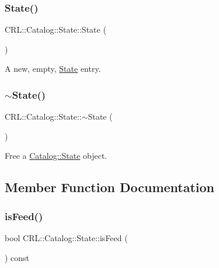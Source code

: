 \subsubsection{\texorpdfstring{State()}{State()}}
{\footnotesize\ttfamily C\+R\+L\+::\+Catalog\+::\+State\+::\+State (\begin{DoxyParamCaption}{ }\end{DoxyParamCaption})\hspace{0.3cm}{\ttfamily [inline]}}

A new, empty, \mbox{\hyperlink{classCRL_1_1Catalog_1_1State}{State}} entry. \mbox{\label{classCRL_1_1Catalog_1_1State_ae25003eae8262a994fba979f28c35aed}} 
\subsubsection{\texorpdfstring{$\sim$\+State()}{~State()}}
{\footnotesize\ttfamily C\+R\+L\+::\+Catalog\+::\+State\+::$\sim$\+State (\begin{DoxyParamCaption}{ }\end{DoxyParamCaption})}

Free a \mbox{\hyperlink{classCRL_1_1Catalog_1_1State}{Catalog\+::\+State}} object. 

\subsection{Member Function Documentation}
\mbox{\label{classCRL_1_1Catalog_1_1State_a53c89121d49a7fc9f8a09093a35d32c4}} 
\subsubsection{\texorpdfstring{is\+Feed()}{isFeed()}}
{\footnotesize\ttfamily bool C\+R\+L\+::\+Catalog\+::\+State\+::is\+Feed (\begin{DoxyParamCaption}{ }\end{DoxyParamCaption}) const\hspace{0.3cm}{\ttfamily [inline]}}

